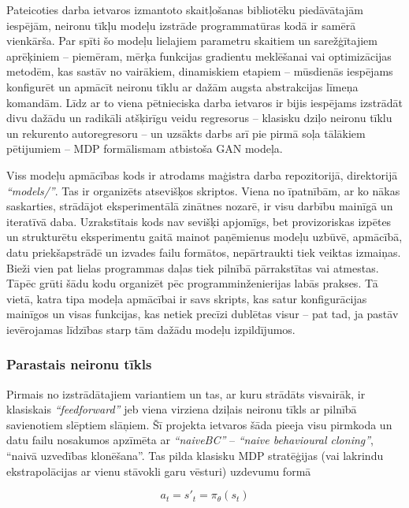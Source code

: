 \documentclass[12pt, a4paper]{article}
\numberwithin{equation}{section} %
\begin{document}
Pateicoties darba ietvaros izmantoto skaitļošanas bibliotēku piedāvātajām iespējām, neironu tīkļu modeļu izstrāde programmatūras kodā ir samērā vienkārša. Par spīti šo modeļu lielajiem parametru skaitiem un sarežģītajiem aprēķiniem -- piemēram, mērķa funkcijas gradientu meklēšanai vai optimizācijas metodēm, kas sastāv no vairākiem, dinamiskiem etapiem -- mūsdienās iespējams konfigurēt un apmācīt neironu tīklu ar dažām augsta abstrakcijas līmeņa komandām. Līdz ar to viena pētnieciska darba ietvaros ir bijis iespējams izstrādāt divu dažādu un radikāli atšķirīgu veidu regresorus -- klasisku dziļo neironu tīklu un rekurento autoregresoru -- un uzsākts darbs arī pie pirmā soļa tālākiem pētijumiem -- MDP formālismam atbistoša GAN modeļa. 

Viss modeļu apmācības kods ir atrodams maģistra darba repozitorijā, direktorijā \textit{``models/''}. Tas ir organizēts atsevišķos skriptos. Viena no īpatnībām, ar ko nākas saskarties, strādājot eksperimentālā zinātnes nozarē, ir visu darbību mainīgā un iteratīvā daba. Uzrakstītais kods nav sevišķi apjomīgs, bet provizoriskas izpētes un strukturētu eksperimentu gaitā mainot paņēmienus modeļu uzbūvē, apmācībā, datu priekšapstrādē un izvades failu formātos, nepārtraukti tiek veiktas izmaiņas. Bieži vien pat lielas programmas daļas tiek pilnībā pārrakstītas vai atmestas. Tāpēc grūti šādu kodu organizēt pēc programminženierijas labās prakses. Tā vietā, katra tipa modeļa apmācībai ir savs skripts, kas satur konfigurācijas mainīgos un visas funkcijas, kas netiek precīzi dublētas visur -- pat tad, ja pastāv ievērojamas līdzības starp tām dažādu modeļu izpildījumos. 

\subsubsection{Parastais neironu tīkls}

Pirmais no izstrādātajiem variantiem un tas, ar kuru strādāts visvairāk, ir klasiskais \textit{``feedforward''} jeb viena virziena dziļais neironu tīkls ar pilnībā savienotiem slēptiem slāņiem. Šī projekta ietvaros šāda pieeja visu pirmkoda un datu failu nosakumos apzīmēta ar \textit{``naiveBC''} -- \textit{``naive behavioural cloning''}, ``naivā uzvedības klonēšana''. Tas pilda klasisku MDP stratēģijas (vai lakrindu ekstrapolācijas ar vienu stāvokli garu vēsturi) uzdevumu formā

\begin{equation}
    a_t = s'_t = \pi_{\theta}(s_t)
\end{equation}
\end{document}
